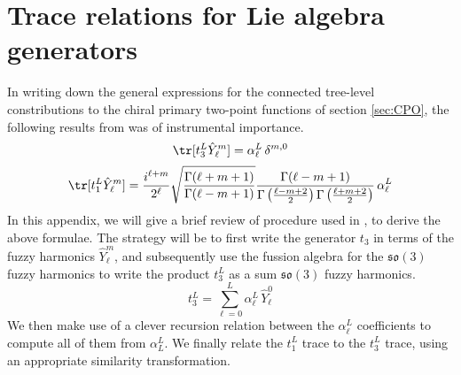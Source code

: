%
\section{Trace relations for Lie algebra generators}\label{app:trace_relations}
In writing down the general expressions for the connected tree-level constributions to the chiral primary two-point functions of section \ref{sec:CPO}, the following results from \cite{Two-point functions in D5-D3} was of instrumental importance.
%
%
\begin{equation}
\tr[ t_3^L \hat{Y}^m_{\ell} ] = \alpha^L_\ell \, \delta^{m,0}
\end{equation}
%
%
\begin{equation}
\tr[ t_1^L \hat{Y}^m_{\ell} ]
=
\frac{i^{\ell+m}}{2^\ell}
\sqrt{\frac{\Gamma(\ell+m+1)}{\Gamma(\ell-m+1)}}
\frac{\Gamma(\ell-m+1)}
{
\Gamma \left( \frac{\ell-m+2}{2} \right)
\Gamma \left( \frac{\ell+m+2}{2} \right)
} \,
\alpha^L_\ell
\end{equation}
%
%
In this appendix, we will give a brief review of procedure used in \cite{Two-point functions in D5-D3}, to derive the above formulae. The strategy will be to first write the generator $t_3$ in terms of the fuzzy harmonics $\hat{Y}^m_{\ell}$, and subsequently use the fussion algebra for the $\mathfrak{so}(3)$ fuzzy harmonics to write the product $t_3^L$ as a sum $\mathfrak{so}(3)$ fuzzy harmonics.
%
%
\begin{equation}
t_3^L = \sum_{\ell=0}^L \alpha^L_\ell \, \hat{Y}^0_\ell
\end{equation}
%
%
We then make use of a clever recursion relation between the $\alpha^L_\ell$ coefficients to compute all of them from $\alpha^L_L$. We finally relate the $t_1^L$ trace to the $t_3^L$ trace, using an appropriate similarity transformation.


